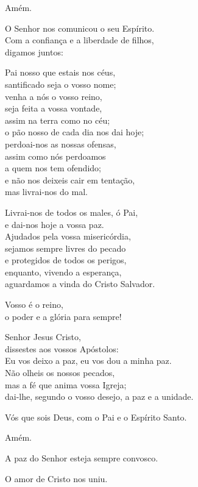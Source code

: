 \documentclass{book}
\begin{document}
\begin{flushleft}
    Amém.

    O Senhor nos comunicou o seu Espírito. \\
    Com a confiança e a liberdade de filhos, \\
    digamos juntos:

    Pai nosso que estais nos céus, \\
    santificado seja o vosso nome; \\
    venha a nós o vosso reino, \\
    seja feita a vossa vontade, \\
    assim na terra como no céu; \\
    o pão nosso de cada dia nos dai hoje; \\
    perdoai-nos as nossas ofensas, \\
    assim como nós perdoamos \\
    a quem nos tem ofendido; \\
    e não nos deixeis cair em tentação, \\
    mas livrai-nos do mal.

    Livrai-nos de todos os males, ó Pai, \\
    e dai-nos hoje a vossa paz. \\
    Ajudados pela vossa misericórdia, \\
    sejamos sempre livres do pecado \\
    e protegidos de todos os perigos, \\
    enquanto, vivendo a esperança, \\
    aguardamos a vinda do Cristo Salvador.

    Vosso é o reino, \\
    o poder e a glória para sempre!

    Senhor Jesus Cristo, \\
    dissestes aos vossos Apóstolos: \\
    Eu vos deixo a paz, eu vos dou a minha paz. \\
    Não olheis os nossos pecados, \\
    mas a fé que anima vossa Igreja; \\
    dai-lhe, segundo o vosso desejo, a paz e a unidade.

    Vós que sois Deus, com o Pai e o Espírito Santo.

    Amém.

    A paz do Senhor esteja sempre convosco.

    O amor de Cristo nos uniu.


\end{flushleft}
\end{document}
